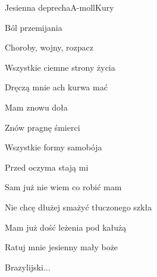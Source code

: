 \begin{song}{Jesienna deprecha}{A-moll}{}{Kury}{}{}
  \begin{SBVerse}
     

     

     

     
  \end{SBVerse}
  \begin{SBVerse}
    Ból przemijania

    Choroby, wojny, rozpacz

    Wszystkie ciemne strony życia

    Dręczą mnie ach kurwa mać
  \end{SBVerse}
  \begin{SBChorus}
     

     

     

  \end{SBChorus}
  \begin{SBVerse}
    Mam znowu doła

    Znów pragnę śmierci

    Wszystkie formy samobója

    Przed oczyma stają mi
  \end{SBVerse}
  \begin{SBVerse}
    Sam już nie wiem co robić mam

    Nie chcę dłużej smażyć tłuczonego szkła

    Mam już dość leżenia pod kałużą

    Ratuj mnie jesienny mały boże
  \end{SBVerse}
  \begin{SBChorus}
    Brazylijski...
  \end{SBChorus}
\end{song}
